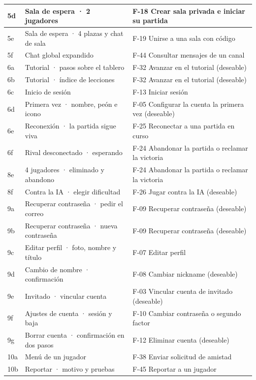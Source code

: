 \begin{center}
\begin{longtable}{|L{0.115\textwidth}|L{0.40\textwidth}|L{0.385\textwidth}|}
5d & Sala de espera · 2 jugadores & \mbox{F-18} Crear sala privada e iniciar su partida \\ \hline
5e & Sala de espera · 4 plazas y chat de sala & \mbox{F-19} Unirse a una sala con código \\ \hline
5f & Chat global expandido & \mbox{F-44} Consultar mensajes de un canal \\ \hline
6a & Tutorial · pasos sobre el tablero & \mbox{F-32} Avanzar en el tutorial (deseable) \\ \hline
6b & Tutorial · índice de lecciones & \mbox{F-32} Avanzar en el tutorial (deseable) \\ \hline
6c & Inicio de sesión & \mbox{F-13} Iniciar sesión \\ \hline
6d & Primera vez · nombre, peón e icono & \mbox{F-05} Configurar la cuenta la primera vez (deseable) \\ \hline
6e & Reconexión · la partida sigue viva & \mbox{F-25} Reconectar a una partida en curso \\ \hline
6f & Rival desconectado · esperando & \mbox{F-24} Abandonar la partida o reclamar la victoria \\ \hline
8e & 4 jugadores · eliminado y abandono & \mbox{F-24} Abandonar la partida o reclamar la victoria \\ \hline
8f & Contra la IA · elegir dificultad & \mbox{F-26} Jugar contra la IA (deseable) \\ \hline
9a & Recuperar contraseña · pedir el correo & \mbox{F-09} Recuperar contraseña (deseable) \\ \hline
9b & Recuperar contraseña · nueva contraseña & \mbox{F-09} Recuperar contraseña (deseable) \\ \hline
9c & Editar perfil · foto, nombre y título & \mbox{F-07} Editar perfil \\ \hline
9d & Cambio de nombre · confirmación & \mbox{F-08} Cambiar nickname (deseable) \\ \hline
9e & Invitado · vincular cuenta & \mbox{F-03} Vincular cuenta de invitado (deseable) \\ \hline
9f & Ajustes de cuenta · sesión y baja & \mbox{F-10} Cambiar contraseña o segundo factor \\ \hline
9g & Borrar cuenta · confirmación en dos pasos & \mbox{F-12} Eliminar cuenta (deseable) \\ \hline
10a & Menú de un jugador & \mbox{F-38} Enviar solicitud de amistad \\ \hline
10b & Reportar · motivo y pruebas & \mbox{F-45} Reportar a un jugador \\ \hline

\end{longtable}
\end{center}
